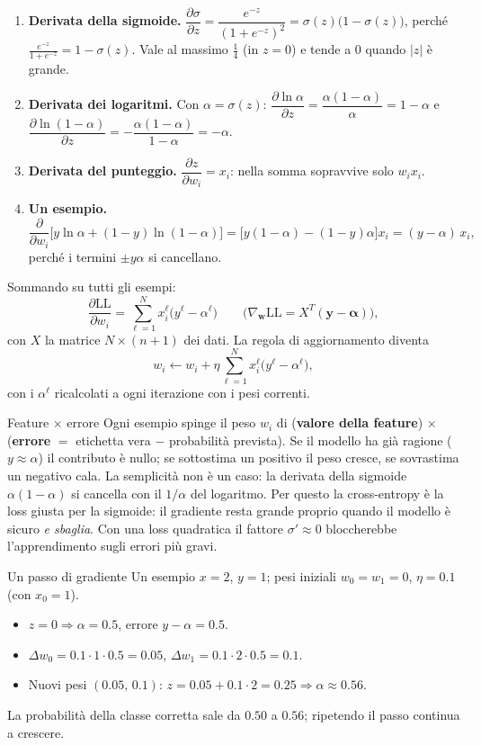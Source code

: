 \documentclass[12pt]{extarticle}
\begin{document}
\begin{enumerate}
    \item \textbf{Derivata della sigmoide.} $\dfrac{\partial\sigma}{\partial z}=\dfrac{e^{-z}}{(1+e^{-z})^2}=\sigma(z)\big(1-\sigma(z)\big)$, perché $\frac{e^{-z}}{1+e^{-z}}=1-\sigma(z)$. Vale al massimo $\frac14$ (in $z=0$) e tende a 0 quando $|z|$ è grande.
    \item \textbf{Derivata dei logaritmi.} Con $\alpha=\sigma(z)$: $\dfrac{\partial\ln\alpha}{\partial z}=\dfrac{\alpha(1-\alpha)}{\alpha}=1-\alpha$ e $\dfrac{\partial\ln(1-\alpha)}{\partial z}=-\dfrac{\alpha(1-\alpha)}{1-\alpha}=-\alpha$.
    \item \textbf{Derivata del punteggio.} $\dfrac{\partial z}{\partial w_i}=x_i$: nella somma sopravvive solo $w_ix_i$.
    \item \textbf{Un esempio.}
    \[
    \frac{\partial}{\partial w_i}\Big[y\ln\alpha+(1-y)\ln(1-\alpha)\Big]
    =\big[y(1-\alpha)-(1-y)\alpha\big]x_i=(y-\alpha)\,x_i,
    \]
    perché i termini $\pm y\alpha$ si cancellano.
\end{enumerate}
Sommando su tutti gli esempi:
\[
\frac{\partial\mathrm{LL}}{\partial w_i}=\sum_{\ell=1}^N x_i^\ell\big(y^\ell-\alpha^\ell\big)
\qquad\Big(\nabla_\mathbf{w}\mathrm{LL}=X^T(\mathbf{y}-\boldsymbol{\alpha})\Big),
\]
con $X$ la matrice $N\times(n+1)$ dei dati. La regola di aggiornamento diventa
\[
w_i\leftarrow w_i+\eta\sum_{\ell=1}^N x_i^\ell\big(y^\ell-\alpha^\ell\big),
\]
con i $\alpha^\ell$ ricalcolati a ogni iterazione con i pesi correnti.

\begin{ideabox}{Feature $\times$ errore}
Ogni esempio spinge il peso $w_i$ di (\textbf{valore della feature}) $\times$ (\textbf{errore} $=$ etichetta vera $-$ probabilità prevista). Se il modello ha già ragione ($y\approx\alpha$) il contributo è nullo; se sottostima un positivo il peso cresce, se sovrastima un negativo cala. La semplicità non è un caso: la derivata della sigmoide $\alpha(1-\alpha)$ si cancella con il $1/\alpha$ del logaritmo. Per questo la cross-entropy è la loss giusta per la sigmoide: il gradiente resta grande proprio quando il modello è sicuro \emph{e sbaglia}. Con una loss quadratica il fattore $\sigma'\approx0$ bloccherebbe l'apprendimento sugli errori più gravi.
\end{ideabox}

\begin{esempiobox}{Un passo di gradiente}
Un esempio $x=2$, $y=1$; pesi iniziali $w_0=w_1=0$, $\eta=0.1$ (con $x_0=1$).
\begin{itemize}
    \item $z=0\Rightarrow\alpha=0.5$, errore $y-\alpha=0.5$.
    \item $\Delta w_0=0.1\cdot1\cdot0.5=0.05$, \quad $\Delta w_1=0.1\cdot2\cdot0.5=0.1$.
    \item Nuovi pesi $(0.05,\,0.1)$: $z=0.05+0.1\cdot2=0.25\Rightarrow\alpha\approx0.56$.
\end{itemize}
La probabilità della classe corretta sale da $0.50$ a $0.56$; ripetendo il passo continua a crescere.
\end{esempiobox}
\end{document}

